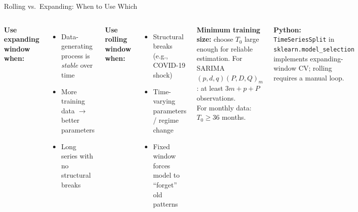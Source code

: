 \documentclass[aspectratio=169, 11pt]{beamer}
\begin{document}
\begin{frame}{Rolling vs.\ Expanding: When to Use Which}
  \begin{columns}[T]
      \textbf{Use expanding window when:}
      \begin{itemize}\small
        \item Data-generating process is \emph{stable} over time
        \item More training data $\to$ better parameters
        \item Long series with no structural breaks
      \end{itemize}
      \vspace{0.15cm}
      \textbf{Use rolling window when:}
      \begin{itemize}\small
        \item Structural breaks (e.g., COVID-19 shock)
        \item Time-varying parameters / regime change
        \item Fixed window forces model to ``forget'' old patterns
      \end{itemize}
      \begin{warningbox}
        {\small \textbf{Minimum training size:} choose $T_0$ large enough
        for reliable estimation. For SARIMA$(p,d,q)(P,D,Q)_m$:
        at least $3m + p + P$ observations.\\[3pt]
        For monthly data: $T_0 \geq 36$ months.}
      \end{warningbox}
      \vspace{0.1cm}
      \textbf{Python:} \texttt{TimeSeriesSplit} in
      \texttt{sklearn.model\_selection}
      implements expanding-window CV; rolling requires a manual loop.
  \end{columns}
\end{frame}
\end{document}
